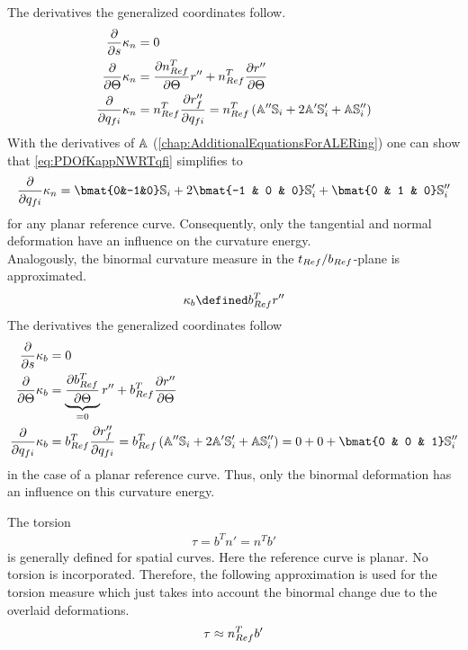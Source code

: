 The derivatives \wrt the generalized coordinates follow.
%
\begin{subequations}
\begin{align}
  \frac{\partial {}}{\partial {s}} \kappa_n &= 0\\
  \frac{\partial {}}{\partial {\Theta}} \kappa_n &= \frac{\partial {n _{Ref}^T}}{\partial {\Theta}} r'' + n _{Ref}^T \frac{\partial {r''}}{\partial {\Theta}}\\
  \frac{\partial {}}{\partial {q_{fi}}} \kappa_n &= n _{Ref}^T \frac{\partial {r_f''}}{\partial {q_{fi}}} = n _{Ref}^T \left(\mathbb{A}'' \mathbb{S}_i + 2 \mathbb{A}' \mathbb{S}'_i + \mathbb{A} \mathbb{S}''_i \right) \label{eq:PDOfKappNWRTqfi}
\end{align}
\end{subequations}
%
With the derivatives of $\mathbb{A}$ (\cref{chap:AdditionalEquationsForALERing}) one can show that \eqref{eq:PDOfKappNWRTqfi} simplifies to
%
\begin{align}
  \pd{}{q_{fi}} \kappa_n = \bmat{0&-1&0} \msS_i + 2 \bmat{-1 & 0 & 0} \msS'_i + \bmat{0 & 1 & 0} \msS''_i
\end{align}
%
for any planar reference curve.
Consequently, only the tangential and normal deformation have an influence on the curvature energy.\\
Analogously, the binormal curvature measure in the $t _{Ref}/b _{Ref}$-plane is approximated.
%
\begin{align*}
  \kappa_b \defined \bRef^T r''
\end{align*}
%
The derivatives \wrt the generalized coordinates follow
%
\begin{subequations}
\begin{align}
  \pd{}{s} \kappa_b &= 0\\
  \pd{}{\Theta} \kappa_b &= \underbrace{\pd{\bRef^T}{\Theta}} _{=0} r'' + \bRef^T \pd{r''}{\Theta}\\
  \pd{}{q_{fi}} \kappa_b &= \bRef^T \pd{r_f''}{q_{fi}} = \bRef^T \left(\msA'' \msS_i + 2 \msA' \msS'_i + \msA \msS''_i \right) = 0 + 0 + \bmat{0 & 0 & 1} \msS''_i
\end{align}
\end{subequations}
%
in the case of a planar reference curve.
Thus, only the binormal deformation has an influence on this curvature energy.\par

The torsion
%
\begin{align*}
  \tau = b^T n' = n^T b'
\end{align*}
%
is generally defined for spatial curves.
Here the reference curve is planar.
No torsion is incorporated.
Therefore, the following approximation is used for the torsion measure which just takes into account the binormal change due to the overlaid deformations.
%
\begin{align*}
  \tau \approx n _{Ref}^T b'
\end{align*}
%

